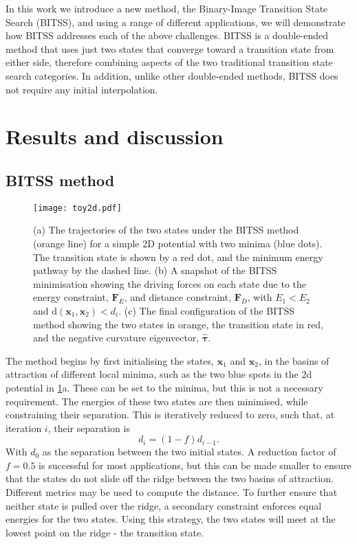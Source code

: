 \documentclass[twocolumn,10pt]{revtex4}
\begin{document}
In this work we introduce a new method, the Binary-Image Transition State Search (BITSS), and using a range of different applications, we will demonstrate how BITSS addresses each of the above challenges.
BITSS is a double-ended method that uses just two states that converge toward a transition state from either side, therefore combining aspects of the two traditional transition state search categories.
In addition, unlike other double-ended methods, BITSS does not require any initial interpolation.


\section{Results and discussion}
\subsection{BITSS method}
\begin{figure}[htb]
  \texttt{[image: toy2d.pdf]}
  \caption{\label{fig:toy2d}
    (a) The trajectories of the two states under the BITSS method (orange line) for a simple 2D potential with two minima (blue dots).
        The transition state is shown by a red dot, and the minimum energy pathway by the dashed line.
    (b) A snapshot of the BITSS minimisation showing the driving forces on each state due to the energy constraint, $\bm{F}_E$, and distance constraint, $\bm{F}_D$, with $E_1 < E_2$ and $\mathrm{d}(\bm{x}_1,\bm{x}_2) < d_i$.
    (c) The final configuration of the BITSS method showing the two states in orange, the transition state in red, and the negative curvature eigenvector, $\bm{\hat{\tau}}$.
  }
\end{figure}

The method begins by first initialising the states, $\bm{x}_1$ and $\bm{x}_2$, in the basins of attraction of different local minima, such as the two blue spots in the 2d potential in \cref{fig:toy2d}a.
These can be set to the minima, but this is not a necessary requirement.
The energies of these two states are then minimised, while constraining their separation.
This is iteratively reduced to zero, such that, at iteration $i$, their separation is
\begin{equation}\label{eq:diteration}
  d_i = (1 - f) d_{i-1}.
\end{equation}
With $d_0$ as the separation between the two initial states.
A reduction factor of $f = 0.5$ is successful for most applications, but this can be made smaller to ensure that the states do not slide off the ridge between the two basins of attraction.
Different metrics may be used to compute the distance.
To further ensure that neither state is pulled over the ridge, a secondary constraint enforces equal energies for the two states.
Using this strategy, the two states will meet at the lowest point on the ridge - the transition state.
\end{document}
